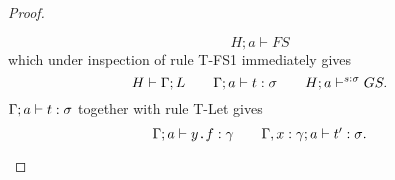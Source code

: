\begin{proof}
\begin{description}
\begin{description}
\begin{description}
              \begin{equation}
                H; a \vdash FS
              \end{equation}
              which under inspection of rule {\sc T-FS1} immediately gives
              \begin{equation}
                H \vdash \Gamma; L \quad\quad \mbox{$\Gamma;a\vdash t:\sigma$}
                \quad\quad H; a \vdash^{s: \sigma} GS.
              \end{equation}
              $\mbox{$\Gamma;a\vdash t:\sigma$}$ together with rule {\sc T-Let}
              gives
              \begin{equation}
                \mbox{$\Gamma;a\vdash\mbox{$y$\texttt{.}$f$}:\gamma$} \quad\quad
                \mbox{$\Gamma, x: \gamma;a\vdash t':\sigma$}.
              \end{equation}

          \end{description}
      \end{description}
  \end{description}
\end{proof}








